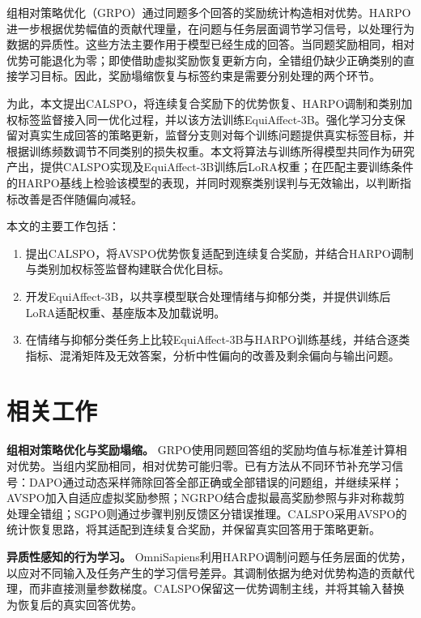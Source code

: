 \documentclass[UTF8,a4paper,11pt,fontset=windows]{ctexart}
\begin{document}
组相对策略优化（GRPO）通过同题多个回答的奖励统计构造相对优势\cite{ref7}。HARPO进一步根据优势幅值的贡献代理量，在问题与任务层面调节学习信号，以处理行为数据的异质性\cite{ref8}。这些方法主要作用于模型已经生成的回答。当同题奖励相同，相对优势可能退化为零；即使借助虚拟奖励恢复更新方向\cite{ref9}，全错组仍缺少正确类别的直接学习目标。因此，奖励塌缩恢复与标签约束是需要分别处理的两个环节。

为此，本文提出CALSPO，将连续复合奖励下的优势恢复、HARPO调制和类别加权标签监督接入同一优化过程，并以该方法训练EquiAffect-3B。强化学习分支保留对真实生成回答的策略更新，监督分支则对每个训练问题提供真实标签目标，并根据训练频数调节不同类别的损失权重。本文将算法与训练所得模型共同作为研究产出，提供CALSPO实现及EquiAffect-3B训练后LoRA权重；在匹配主要训练条件的HARPO基线上检验该模型的表现，并同时观察类别误判与无效输出，以判断指标改善是否伴随偏向减轻。

本文的主要工作包括：

\begin{enumerate}
\item 提出CALSPO，将AVSPO优势恢复适配到连续复合奖励，并结合HARPO调制与类别加权标签监督构建联合优化目标。
\item 开发EquiAffect-3B，以共享模型联合处理情绪与抑郁分类，并提供训练后LoRA适配权重、基座版本及加载说明。
\item 在情绪与抑郁分类任务上比较EquiAffect-3B与HARPO训练基线，并结合逐类指标、混淆矩阵及无效答案，分析中性偏向的改善及剩余偏向与输出问题。
\end{enumerate}

\section{相关工作}

\textbf{组相对策略优化与奖励塌缩。} GRPO使用同题回答组的奖励均值与标准差计算相对优势\cite{ref7}。当组内奖励相同，相对优势可能归零。已有方法从不同环节补充学习信号：DAPO通过动态采样筛除回答全部正确或全部错误的问题组，并继续采样\cite{ref10}；AVSPO加入自适应虚拟奖励参照\cite{ref9}；NGRPO结合虚拟最高奖励参照与非对称裁剪处理全错组\cite{ref11}；SGPO则通过步骤判别反馈区分错误推理\cite{ref12}。CALSPO采用AVSPO的统计恢复思路，将其适配到连续复合奖励，并保留真实回答用于策略更新。

\textbf{异质性感知的行为学习。} OmniSapiens利用HARPO调制问题与任务层面的优势，以应对不同输入及任务产生的学习信号差异\cite{ref8}。其调制依据为绝对优势构造的贡献代理，而非直接测量参数梯度。CALSPO保留这一优势调制主线，并将其输入替换为恢复后的真实回答优势。
\end{document}
